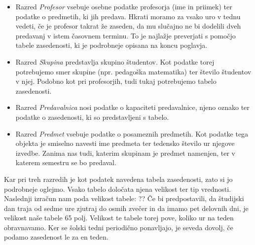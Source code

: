 \documentclass[10pt,a4paper]{article}
\begin{document}

\begin{itemize}
   
   \item Razred \emph{Profesor} vsebuje osebne podatke profesorja (ime in priimek) ter
   podatke o predmetih, ki jih predava. Hkrati moramo za vsako uro v tednu vedeti, če
   je profesor takrat že zaseden, da mu slučajno ne bi dodelili dveh predavanj v istem
   časovnem terminu. To je najlažje preverjati s pomočjo tabele zasedenosti, ki je
   podrobneje opisana na koncu poglavja.

   \item Razred \emph {Skupina} predstavlja skupino študentov. Kot podatke torej potrebujemo
   smer skupine (npr. pedagoška matematika) ter število študentov v njej. Podobno kot pri
   profesorjih, tudi tukaj potrebujemo tabelo zasedenosti.

   \item Razred \emph {Predavalnica} nosi podatke o kapaciteti predavalnice, njeno oznako
   ter podatke o zasedenosti, ki so predstavljeni s tabelo.

   \item Razred \emph {Predmet} vsebuje podatke o posameznih predmetih. Kot podatke tega
   objekta je smiselno navesti ime predmeta ter tedensko število ur njegove izvedbe.
   Zanima nas tudi, katerim skupinam je predmet namenjen, ter v katerem semestru se bo
   predaval.
\end{itemize}
\noindent
Kar pri treh razredih je kot podatek navedena tabela zasedenosti, zato si jo podrobneje
oglejmo. Vsako tabelo določata njena velikost ter tip vrednosti. Naslednji izračun nam
poda velikost tabele:
??
Če bi predpostavili, da študijski dan traja od sedme ure zjutraj do osmih zvečer in da
imamo pet delovnih dni, je velikost naše tabele 65 polj. Velikost te tabele torej pove,
koliko ur na teden obravnavamo. Ker se šolski tedni periodično ponavljajo, je seveda
dovolj, če podamo zasedenost le za en teden.
\end{document}
